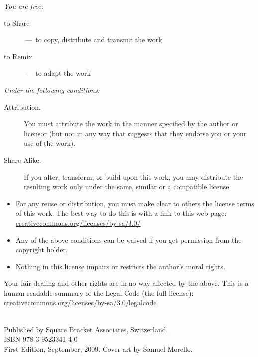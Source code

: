 \documentclass[a4paper,10pt,twoside]{book}
\begin{document}
\begin{footnotesize}
\emph{You are free:}
\begin{description}
  \item[to Share] \,---\, to copy, distribute and transmit the work
  \item[to Remix] \,---\, to adapt the work
\end{description}
\emph{Under the following conditions:}
\begin{description}
  \item[Attribution.] You must attribute the work in the manner specified by the author or licensor (but not in any way that suggests that they endorse you or your use of the work).
  \item[Share Alike.] If you alter, transform, or build upon this work, you may distribute the resulting work only under the same, similar or a compatible license.
\end{description}
\begin{itemize}
  \item For any reuse or distribution, you must make clear to others the license terms of this work. The best way to do this is with a link to this web page:
  \url{creativecommons.org/licenses/by-sa/3.0/}
  \item Any of the above conditions can be waived if you get permission from the copyright holder.
  \item Nothing in this license impairs or restricts the author's moral rights.
\end{itemize}
\quad
\parbox{\textwidth-2cm-1em}{
	Your fair dealing and other rights are in no way affected by the above.
	This is a human-readable summary of the Legal Code (the full license):\\
	\url{creativecommons.org/licenses/by-sa/3.0/legalcode}}\\[1cm]
Published by Square Bracket Associates, Switzerland. \sba\\
ISBN 978-3-9523341-4-0\\
First Edition, September, 2009.
Cover art by Samuel Morello.
\end{footnotesize}
\vfill
%
\tableofcontents
\sloppy %

\mainmatter
\end{document}
